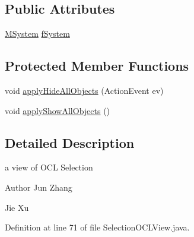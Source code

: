 \subsection*{Public Attributes}
\begin{DoxyCompactItemize}
\item 
\hyperlink{classorg_1_1tzi_1_1use_1_1uml_1_1sys_1_1_m_system}{M\-System} \hyperlink{classorg_1_1tzi_1_1use_1_1gui_1_1views_1_1selection_1_1objectselection_1_1_selection_o_c_l_view_a88f80a85d27facf8d0bf8eca280d0a98}{f\-System}
\end{DoxyCompactItemize}
\subsection*{Protected Member Functions}
\begin{DoxyCompactItemize}
\item 
void \hyperlink{classorg_1_1tzi_1_1use_1_1gui_1_1views_1_1selection_1_1objectselection_1_1_selection_o_c_l_view_a2cce4010b2a7bf743b0949dad3f7425d}{apply\-Hide\-All\-Objects} (Action\-Event ev)
\item 
void \hyperlink{classorg_1_1tzi_1_1use_1_1gui_1_1views_1_1selection_1_1objectselection_1_1_selection_o_c_l_view_ad875ac0e1641f06d84e8efa3aa7604fe}{apply\-Show\-All\-Objects} ()
\end{DoxyCompactItemize}


\subsection{Detailed Description}
a view of O\-C\-L Selection

\begin{DoxyAuthor}{Author}
Jun Zhang 

Jie Xu 
\end{DoxyAuthor}


Definition at line 71 of file Selection\-O\-C\-L\-View.\-java.



